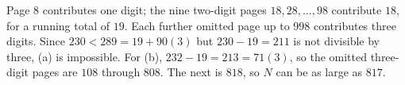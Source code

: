 Page $8$ contributes one digit; the nine two-digit pages $18,28,\ldots,98$ contribute $18$, for a running total of $19$. Each further omitted page up to $998$ contributes three digits. Since $230<289=19+90(3)$ but $230-19=211$ is not divisible by three, (a) is impossible. For (b), $232-19=213=71(3)$, so the omitted three-digit pages are $108$ through $808$. The next is $818$, so $N$ can be as large as $\boxed{817}$.
